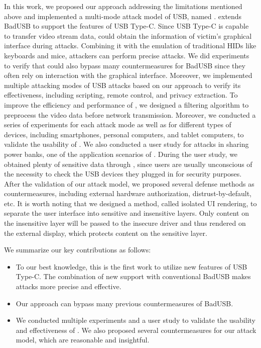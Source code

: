 In this work, we proposed our approach addressing the limitations mentioned above and implemented a multi-mode attack model of USB, named \tool.
\tool extends BadUSB to support the features of USB Type-C.
Since USB Type-C is capable to transfer video stream data, \tool could obtain the information of victim's graphical interface during attacks.
Combining it with the emulation of traditional HIDs like keyboards and mice, attackers can perform precise attacks.
We did experiments to verify that \tool could also bypass many countermeasures for BadUSB since they often rely on interaction with the graphical interface.
Moreover, we implemented multiple attacking modes of USB attacks based on our approach to verify its effectiveness, including scripting, remote control, and privacy extraction.
To improve the efficiency and performance of \tool, we designed a filtering algorithm to preprocess the video data before network transmission.
Moreover, we conducted a series of experiments for each attack mode as well as for different types of devices, including smartphones, personal computers, and tablet computers, to validate the usability of \tool.
We also conducted a user study for attacks in sharing power banks, one of the application scenarios of \tool.
During the user study, we obtained plenty of sensitive data through \tool, since users are usually unconscious of the necessity to check the USB devices they plugged in for security purposes.
After the validation of our attack model, we proposed several defense methods as countermeasures, including external hardware authorization, distrust-by-default, etc.
It is worth noting that we designed a method, called isolated UI rendering, to separate the user interface into sensitive and insensitive layers.
Only content on the insensitive layer will be passed to the insecure driver and thus rendered on the external display, which protects content on the sensitive layer.

We summarize our key contributions as follows:
\begin{itemize}
	\item To our best knowledge, this is the first work to utilize new features of USB Type-C.
	The combination of new support with conventional BadUSB makes attacks more precise and effective.
	\item Our approach can bypass many previous countermeasures of BadUSB.
	\item We conducted multiple experiments and a user study to validate the usability and effectiveness of \tool.
	We also proposed several countermeasures for our attack model, which are reasonable and insightful. 
\end{itemize}

